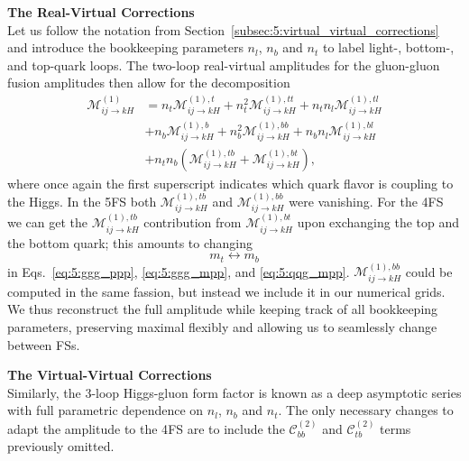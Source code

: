 \textbf{The Real-Virtual Corrections} \\
Let us follow the notation from Section~\ref{subsec:5:virtual_virtual_corrections} and introduce the bookkeeping parameters $n_l$, $n_b$ and $n_t$ to label light-, bottom-, and top-quark loops. The two-loop real-virtual amplitudes for the gluon-gluon fusion amplitudes then allow for the decomposition
\begin{equation}
\begin{split}
\mathcal{M}_{ij \rightarrow k H}^{(1)} &= n_t \mathcal{M}_{ij \rightarrow kH}^{(1),t} +  n_t^2 \mathcal{M}_{ij \rightarrow kH}^{(1),tt} +  n_t n_l \mathcal{M}_{ij \rightarrow kH}^{(1),tl} \\
& +  n_b \mathcal{M}_{ij \rightarrow kH}^{(1),b} +  n_b^2 \mathcal{M}_{ij \rightarrow kH}^{(1),bb} +  n_b n_l \mathcal{M}_{ij \rightarrow kH}^{(1),bl} \\
& + n_t n_b \left( \mathcal{M}_{ij \rightarrow k H}^{(1), tb} + \mathcal{M}_{ij \rightarrow k H}^{(1), bt} \right),
\end{split}
\label{eq:5:real_virtual_decomposition}
\end{equation}
where once again the first superscript indicates which quark flavor is coupling to the Higgs. In the 5\acs{FS} both $\mathcal{M}_{ij \rightarrow k H}^{(1), tb}$ and $\mathcal{M}_{ij \rightarrow k H}^{(1), bb}$ were vanishing. For the 4\acs{FS} we can get the $\mathcal{M}_{ij \rightarrow k H}^{(1), tb}$ contribution from $\mathcal{M}_{ij \rightarrow k H}^{(1), bt}$ upon exchanging the top and the bottom quark; this amounts to changing
\begin{equation}
m_t \longleftrightarrow m_b
\end{equation}
in Eqs.~\eqref{eq:5:ggg_ppp}, \eqref{eq:5:ggg_mpp}, and \eqref{eq:5:qqg_mpp}. $\mathcal{M}_{ij \rightarrow k H}^{(1), bb}$ could be computed in the same fassion, but instead we include it in our numerical grids. We thus reconstruct the full amplitude while keeping track of all bookkeeping parameters, preserving maximal flexibly and allowing us to seamlessly change between \acs{FS}s.

\textbf{The Virtual-Virtual Corrections} \\
Similarly, the 3-loop Higgs-gluon form factor is known as a deep asymptotic series with full parametric dependence on $n_l$, $n_b$ and $n_t$. The only necessary changes to adapt the amplitude to the 4\acs{FS} are to include the $\mathcal{C}^{(2)}_{bb}$ and $\mathcal{C}^{(2)}_{tb}$ terms previously omitted.


